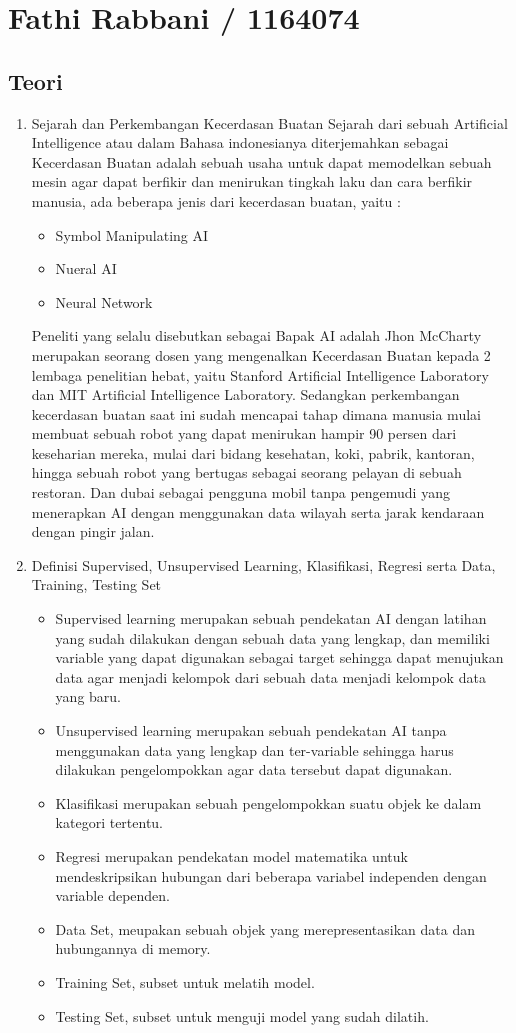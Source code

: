 \section{Fathi Rabbani / 1164074}
\subsection{Teori}
\begin{enumerate}
\item
Sejarah dan Perkembangan Kecerdasan Buatan
\subitem
Sejarah dari sebuah Artificial Intelligence atau dalam Bahasa indonesianya diterjemahkan sebagai Kecerdasan Buatan adalah sebuah usaha untuk dapat memodelkan sebuah mesin agar dapat berfikir dan menirukan tingkah laku dan cara berfikir manusia, ada beberapa jenis dari kecerdasan buatan, yaitu :

\begin{itemize}
\item
Symbol Manipulating AI
\item
Nueral AI
\item
Neural Network
\end{itemize}
\subitem
Peneliti yang selalu disebutkan sebagai Bapak AI adalah Jhon McCharty  merupakan seorang dosen yang mengenalkan Kecerdasan Buatan kepada 2 lembaga penelitian hebat, yaitu Stanford Artificial Intelligence Laboratory dan MIT Artificial Intelligence Laboratory.
\subitem
Sedangkan perkembangan kecerdasan buatan saat ini sudah mencapai tahap dimana manusia mulai membuat sebuah robot yang dapat menirukan hampir 90 persen dari keseharian mereka, mulai dari bidang kesehatan, koki, pabrik, kantoran, hingga sebuah robot yang bertugas sebagai seorang pelayan di sebuah restoran. Dan dubai sebagai pengguna mobil tanpa pengemudi yang menerapkan AI dengan menggunakan data wilayah serta jarak kendaraan dengan pingir jalan.
\item
Definisi Supervised, Unsupervised Learning, Klasifikasi, Regresi serta Data, Training, Testing Set
\begin{itemize}
\item
Supervised learning merupakan sebuah pendekatan AI dengan latihan yang sudah dilakukan dengan sebuah data yang lengkap, dan memiliki variable yang dapat digunakan sebagai target sehingga dapat menujukan data agar menjadi kelompok dari sebuah data menjadi kelompok data yang baru.
\item
Unsupervised learning merupakan sebuah pendekatan AI tanpa menggunakan data yang lengkap dan ter-variable sehingga harus dilakukan pengelompokkan agar data tersebut dapat digunakan.
\item
Klasifikasi merupakan sebuah pengelompokkan suatu objek ke dalam kategori tertentu.
\item
Regresi merupakan pendekatan model matematika untuk mendeskripsikan hubungan dari beberapa variabel independen dengan variable dependen.
\item
Data Set, meupakan sebuah objek yang merepresentasikan data dan hubungannya di memory. 
\item
Training Set, subset untuk melatih model.
\item
Testing Set, subset untuk menguji model yang sudah dilatih.
\end{itemize}



\end{enumerate}
